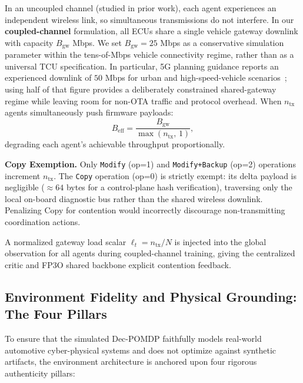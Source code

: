 \documentclass[conference]{IEEEtran}
\begin{document}
In an uncoupled channel (studied in prior work), each agent experiences an independent
wireless link, so simultaneous transmissions do not interfere. In our
\textbf{coupled-channel} formulation, all ECUs share a single vehicle gateway
downlink with capacity $B_{\text{gw}}$ Mbps. We set $B_{\text{gw}}=25$ Mbps as a
conservative simulation parameter within the tens-of-Mbps vehicle connectivity regime,
rather than as a universal TCU specification. In particular, 5G planning guidance reports
an experienced downlink of $50$ Mbps for urban and high-speed-vehicle scenarios~\cite{gsma5g};
using half of that figure provides a deliberately constrained shared-gateway regime while
leaving room for non-OTA traffic and protocol overhead. When $n_{\text{tx}}$ agents
simultaneously push firmware payloads:
\begin{equation}
  B_{\text{eff}} = \frac{B_{\text{gw}}}{\max(n_{\text{tx}},\,1)},
  \label{eq:coupled}
\end{equation}
degrading each agent's achievable throughput proportionally.

\textbf{Copy Exemption.}
Only \texttt{Modify} (op=1) and \texttt{Modify+Backup} (op=2) operations
increment $n_{\text{tx}}$. The \texttt{Copy} operation (op=0) is strictly exempt:
its delta payload is negligible (${\approx}64$ bytes for a control-plane hash
verification), traversing only the local on-board diagnostic bus rather than the
shared wireless downlink. Penalizing Copy for contention would incorrectly discourage
non-transmitting coordination actions.

A normalized gateway load scalar $\ell_t = n_{\text{tx}} / N$ is injected into the
global observation for all agents during coupled-channel training, giving the
centralized critic and FP3O shared backbone explicit contention feedback.

\subsection{Environment Fidelity and Physical Grounding: The Four Pillars}
\label{sec:authenticity}

To ensure that the simulated Dec-POMDP faithfully models real-world automotive cyber-physical
systems and does not optimize against synthetic artifacts, the environment architecture is
anchored upon four rigorous authenticity pillars:
\end{document}
